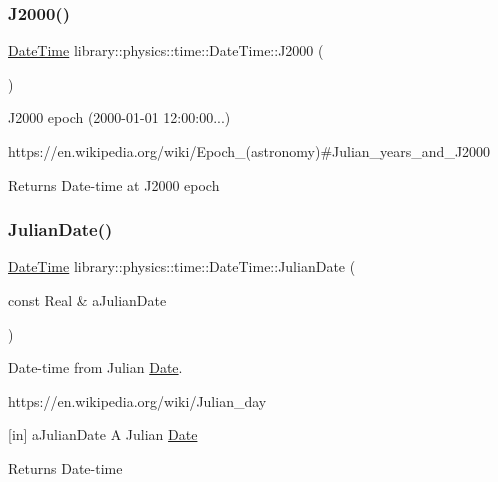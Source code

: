 \subsubsection{\texorpdfstring{J2000()}{J2000()}}
{\footnotesize\ttfamily \hyperlink{classlibrary_1_1physics_1_1time_1_1_date_time}{Date\+Time} library\+::physics\+::time\+::\+Date\+Time\+::\+J2000 (\begin{DoxyParamCaption}{ }\end{DoxyParamCaption})\hspace{0.3cm}{\ttfamily [static]}}



J2000 epoch (2000-\/01-\/01 12\+:00\+:00...) 

https\+://en.wikipedia.\+org/wiki/\+Epoch\+\_\+(astronomy)\#\+Julian\+\_\+years\+\_\+and\+\_\+\+J2000

\begin{DoxyReturn}{Returns}
Date-\/time at J2000 epoch 
\end{DoxyReturn}
\mbox{\label{classlibrary_1_1physics_1_1time_1_1_date_time_a1a8238109f35a9c96d8c0038b41f1c27}} 
\subsubsection{\texorpdfstring{Julian\+Date()}{JulianDate()}}
{\footnotesize\ttfamily \hyperlink{classlibrary_1_1physics_1_1time_1_1_date_time}{Date\+Time} library\+::physics\+::time\+::\+Date\+Time\+::\+Julian\+Date (\begin{DoxyParamCaption}\item[{const Real \&}]{a\+Julian\+Date }\end{DoxyParamCaption})\hspace{0.3cm}{\ttfamily [static]}}



Date-\/time from Julian \hyperlink{classlibrary_1_1physics_1_1time_1_1_date}{Date}. 

https\+://en.wikipedia.\+org/wiki/\+Julian\+\_\+day

\mbox{[}in\mbox{]} a\+Julian\+Date A Julian \hyperlink{classlibrary_1_1physics_1_1time_1_1_date}{Date} \begin{DoxyReturn}{Returns}
Date-\/time 
\end{DoxyReturn}
\mbox{\label{classlibrary_1_1physics_1_1time_1_1_date_time_aa403adb642d299481fda591b93553bbc}} 
